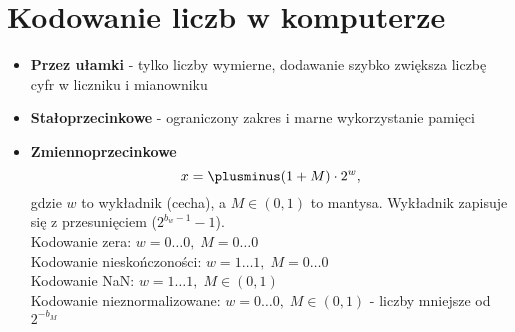 \section{Kodowanie liczb w komputerze}
\begin{itemize}
    \item \textbf{Przez ułamki} - tylko liczby wymierne, dodawanie szybko zwiększa liczbę cyfr w liczniku i mianowniku
    \item \textbf{Stałoprzecinkowe} - ograniczony zakres i marne wykorzystanie pamięci
    \item \textbf{Zmiennoprzecinkowe}
    \[
        x = \plusminus (1+M) \cdot 2^w,
    \]
    gdzie \( w \) to wykładnik (cecha), a \( M \in (0, 1) \) to mantysa. Wykładnik zapisuje się z przesunięciem (\( 2^{b_w-1} - 1 \)). \\
    Kodowanie zera: \;\quad\quad\quad\quad\quad\quad\( w = 0\dots0, \;M=0\dots0 \) \\
    Kodowanie nieskończoności: \;\quad\( w = 1\dots1, \;M=0\dots0 \) \\
    Kodowanie NaN: \;\quad\quad\quad\quad\quad\;\;\;\( w = 1\dots1, \;M \in (0, 1) \) \\
    Kodowanie nieznormalizowane: \( w = 0\dots0, \;M \in (0, 1) \) - liczby mniejsze od \( 2^{-b_M} \)
\end{itemize}